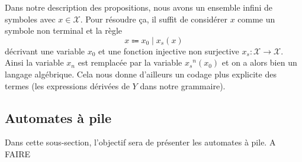 \begin{remark}
  Dans notre description des propositions, nous avons un ensemble infini de
  symboles avec $x \in \mathcal X$. Pour résoudre ça, il suffit de considérer
  $x$ comme un symbole non terminal et la règle
  \[x \Coloneq x_0\mid x_s(x)\]
  décrivant une variable $x_0$ et une fonction injective non surjective
  $x_s : \mathcal X \to \mathcal X$. Ainsi la variable $x_n$ est remplacée par
  la variable ${x_s}^n(x_0)$ et on a alors bien un langage algébrique. Cela
  nous donne d'ailleurs un codage plus explicite des termes (les expressions
  dérivées de $Y$ dans notre grammaire).
\end{remark}

\subsection{Automates à pile}

Dans cette sous-section, l'objectif sera de présenter les automates à pile.
A FAIRE
